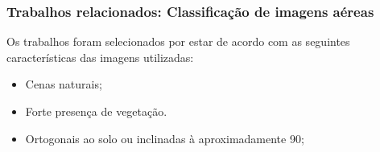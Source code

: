 \documentclass[t]{beamer}
\begin{document}
%
%
%
%
%
%
%
%
%
%
%
%
%

\begin{frame}[c]
	\frametitle{Trabalhos relacionados: Classificação de imagens aéreas}

	Os trabalhos foram selecionados por estar de acordo com as seguintes características das imagens utilizadas:

	\begin{itemize}
		\item Cenas naturais;
		\item Forte presença de vegetação.
 		\item Ortogonais ao solo ou inclinadas à aproximadamente 90\degree;
	\end{itemize}
\end{frame}
\end{document}
